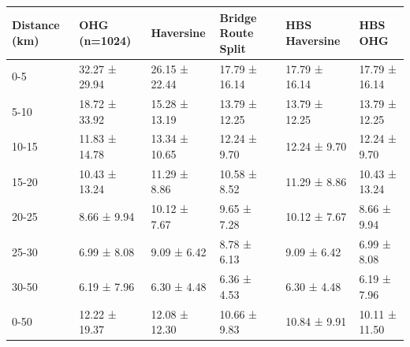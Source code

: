 \begin{tabular}{llllll}
\toprule
Distance (km) & OHG (n=1024) & Haversine & Bridge Route Split & HBS Haversine & HBS OHG \\
\midrule
0-5 & 32.27 ± 29.94 & 26.15 ± 22.44 & 17.79 ± 16.14 & 17.79 ± 16.14 & 17.79 ± 16.14 \\
5-10 & 18.72 ± 33.92 & 15.28 ± 13.19 & 13.79 ± 12.25 & 13.79 ± 12.25 & 13.79 ± 12.25 \\
10-15 & 11.83 ± 14.78 & 13.34 ± 10.65 & 12.24 ± 9.70 & 12.24 ± 9.70 & 12.24 ± 9.70 \\
15-20 & 10.43 ± 13.24 & 11.29 ± 8.86 & 10.58 ± 8.52 & 11.29 ± 8.86 & 10.43 ± 13.24 \\
20-25 & 8.66 ± 9.94 & 10.12 ± 7.67 & 9.65 ± 7.28 & 10.12 ± 7.67 & 8.66 ± 9.94 \\
25-30 & 6.99 ± 8.08 & 9.09 ± 6.42 & 8.78 ± 6.13 & 9.09 ± 6.42 & 6.99 ± 8.08 \\
30-50 & 6.19 ± 7.96 & 6.30 ± 4.48 & 6.36 ± 4.53 & 6.30 ± 4.48 & 6.19 ± 7.96 \\
0-50 & 12.22 ± 19.37 & 12.08 ± 12.30 & 10.66 ± 9.83 & 10.84 ± 9.91 & 10.11 ± 11.50 \\
\bottomrule
\end{tabular}
